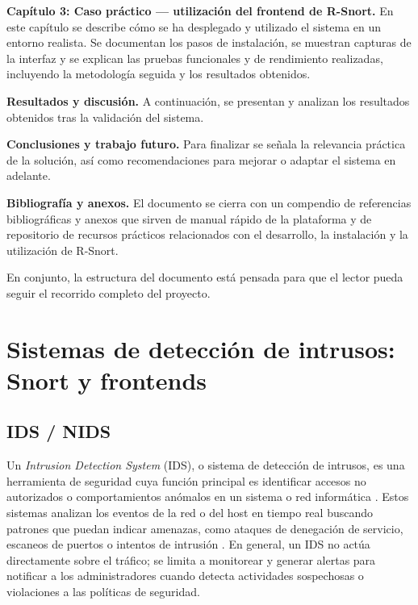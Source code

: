 \documentclass[11pt,a4paper,twoside]{report}
\begin{document}
\textbf{Capítulo 3: Caso práctico — utilización del frontend de R-Snort.} En este capítulo se describe cómo se ha desplegado y utilizado el sistema en un entorno realista. Se documentan los pasos de instalación, se muestran capturas de la interfaz y se explican las pruebas funcionales y de rendimiento realizadas, incluyendo la metodología seguida y los resultados obtenidos.\newline

\textbf{Resultados y discusión.} A continuación, se presentan y analizan los resultados obtenidos tras la validación del sistema.\newline

\textbf{Conclusiones y trabajo futuro.} Para finalizar se señala la relevancia práctica de la solución, así como recomendaciones para mejorar o adaptar el sistema en adelante.\newline

\textbf{Bibliografía y anexos.} El documento se cierra con un compendio de referencias bibliográficas y anexos que sirven de manual rápido de la plataforma y de repositorio de recursos prácticos relacionados con el desarrollo, la instalación y la utilización de R-Snort.\newline

En conjunto, la estructura del documento está pensada para que el lector pueda seguir el recorrido completo del proyecto.


\setcounter{secnumdepth}{2} 

\clearpage
\null
\thispagestyle{empty}
\newpage
\chapter{Sistemas de detección de intrusos: Snort y frontends}

\section{IDS / NIDS}

Un \textit{Intrusion Detection System} (IDS), o sistema de detección de intrusos, es una herramienta de seguridad cuya función principal es identificar accesos no autorizados o comportamientos anómalos en un sistema o red informática \cite{wikiNIDS}. Estos sistemas analizan los eventos de la red o del host en tiempo real buscando patrones que puedan indicar amenazas, como ataques de denegación de servicio, escaneos de puertos o intentos de intrusión \cite{NISTSP80094}. En general, un IDS no actúa directamente sobre el tráfico; se limita a monitorear y generar alertas para notificar a los administradores cuando detecta actividades sospechosas o violaciones a las políticas de seguridad.\newline
\end{document}
